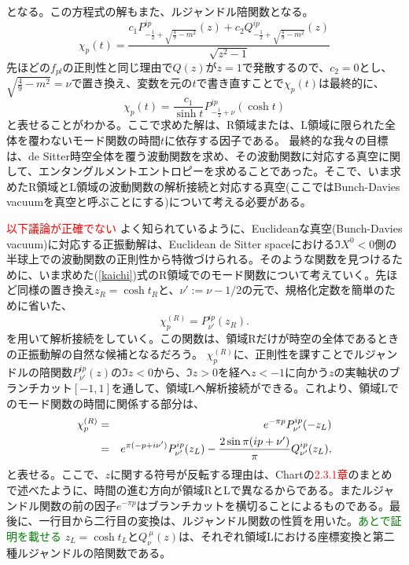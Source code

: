 となる。この方程式の解もまた、ルジャンドル陪関数となる。
\begin{equation}
\chi_p(t)=\frac{c_1P^{ip}_{-\frac{1}{2}+\sqrt{\frac{4}{9}-m^2}}(z)+c_2Q^{ip}_{-\frac{1}{2}+\sqrt{\frac{4}{9}-m^2}}(z)}{\sqrt{z^2-1}}
\end{equation}
先ほどの$f_{pl}$の正則性と同じ理由で$Q(z)$が$z=1$で発散するので、$c_2=0$とし、$\sqrt{\frac{4}{9}-m^2}=\nu$で置き換え、変数を元の$t$で書き直すことで$\chi_p(t)$は最終的に、
\begin{equation}
  \label{kaichi}
  \chi_p(t)=\frac{c_1}{\sinh t}P^{ip}_{-\frac{1}{2}+\nu}(\cosh t)
\end{equation}
と表せることがわかる。ここで求めた解は、R領域または、L領域に限られた全体を覆わないモード関数の時間$t$に依存する因子である。
最終的な我々の目標は、de Sitter時空全体を覆う波動関数を求め、その波動関数に対応する真空に関して、エンタングルメントエントロピーを求めることであった。そこで、いま求めたR領域とL領域の波動関数の解析接続と対応する真空(ここではBunch-Davies vacuumを真空と呼ぶことにする)について考える必要がある。

\textcolor{red}{以下議論が正確でない}
よく知られているように、Euclideanな真空(Bunch-Davies vacuum)に対応する正振動解は、Euclidean de Sitter spaceにおける$\Im X^0<0$側の半球上での波動関数の正則性から特徴づけられる。そのような関数を見つけるために、いま求めた(\ref{kaichi})式のR領域でのモード関数について考えていく。先ほど同様の置き換え$z_R=\cosh t_R$と、$\nu':=\nu-1/2$の元で、規格化定数を簡単のために省いた、
\begin{equation}
  \chi_p^{(R)}=  P^{ip}_{\nu'}(z_R).
\end{equation}
を用いて解析接続をしていく。この関数は、領域Rだけが時空の全体であるときの正振動解の自然な候補となるだろう。
$\chi_p^{(R)}$に、正則性を課すことでルジャンドルの陪関数$P^{ip}_{\nu'}(z)$の$\Im z<0$から、$\Im z>0$を経へ$z<-1$に向かう$z$の実軸状のブランチカット$[-1,1]$を通して、領域Lへ解析接続ができる。これより、領域Lでのモード関数の時間に関係する部分は、
\begin{eqnarray}
  \chi_p^{(R)} & = &
  e^{-\pi p} P^{ip}_{\nu'}(-z_L)
  \nonumber \\
  & = &
  e^{\pi (-p+i\nu')} P^{ip}_{\nu'}(z_L)
   - {2\sin\pi(ip+\nu')\over\pi}Q^{ip}_{\nu'}(z_L),
\end{eqnarray}
と表せる。ここで、$z$に関する符号が反転する理由は、Chartの\textcolor{red}{2.3.1章}のまとめで述べたように、時間の進む方向が領域RとLで異なるからである。またルジャンドル関数の前の因子$e^{-\pi p}$はブランチカットを横切ることによるものである。最後に、一行目から二行目の変換は、ルジャンドル関数の性質を用いた。\textcolor{green}{あとで証明を載せる}
$z_L=\cosh t_L$と$Q^{~\mu}_{\nu}(z)$は、それぞれ領域Lにおける座標変換と第二種ルジャンドルの陪関数である。

